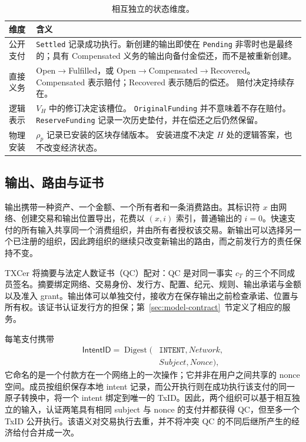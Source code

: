 \begin{table}[!t]
\caption{相互独立的状态维度。}
\label{tab:model-states}
\centering\small
\setlength{\tabcolsep}{3pt}
\begin{tabular}{@{}p{}p{}@{}}
\toprule
维度 & 含义 \\
\midrule
公开支付 &
\texttt{Settled} 记录成功执行。新创建的输出即使在 \texttt{Pending} 非零时也是最终的；具有 Compensated 义务的输出向备付金偿还，而不是被重新创建。 \\

直接义务 &
Open$\to$Fulfilled，或 Open$\to$Compensated$\to$Recovered。
Compensated 表示赔付；Recovered 表示随后的偿还。
赔付决定持续存在。 \\

逻辑表示 &
$V_H$ 中的修订决定该槽位。
\texttt{OriginalFunding} 并不意味着不存在赔付。
\texttt{ReserveFunding} 记录一次历史垫付，并在偿还之后仍然保留。 \\

物理安装 &
$\rho_p$ 记录已安装的区块存储版本。
安装进度不决定 $H$ 处的逻辑答案，也不改变经济状态。 \\
\bottomrule
\end{tabular}
\end{table}

\subsection{输出、路由与证书}
\label{sec:model-certificates}
输出携带一种资产、一个金额、一个所有者和一条消费路由。其标识符 $x$ 由网络、创建交易和输出位置导出，花费以 $(x,i)$ 索引，普通输出的 $i=0$。快速支付的所有输入共享同一个消费组织，并由所有者授权该交易。新输出可以选择另一个已注册的组织，因此跨组织的继续只改变新输出的路由，而之前发行方的责任保持不变。

TXCer 将摘要与法定人数证书（QC）配对：QC 是对同一事实 $c_T$ 的三个不同成员签名。摘要绑定网络、交易身份、发行方、配置、纪元、规则、输出承诺与金额以及准入 grant。输出体可以单独交付，接收方在保存输出之前检查承诺、位置与所有权。该证书认证发行方的担保；第~\ref{sec:model-contract}~节定义了相应的服务。

每笔支付携带
\[\begin{aligned}
\mathsf{IntentID}=\operatorname{Digest}(&\texttt{INTENT},\mathit{Network},\\
&\mathit{Subject},\mathit{Nonce}),
\end{aligned}\]
它命名的是一个付款方在一个网络上的一次操作；它并非在用户之间共享的 nonce 空间。成员按组织保存本地 intent 记录，而公开执行则在成功执行该支付的同一原子转换中，将一个 intent 绑定到唯一的 TxID。因此，两个组织可以基于相互独立的输入，认证两笔具有相同 subject 与 nonce 的支付并都获得 QC，但至多一个 TxID 公开执行。该语义对交易执行去重，并不将冲突 QC 的不同后继所产生的经济给付合并成一次。

